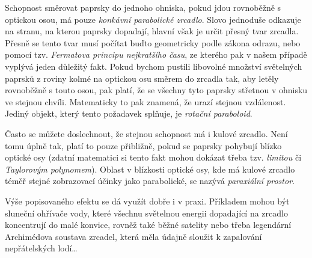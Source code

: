 \documentclass{../../../../style/mkimain}
\begin{document}
\noindent{}
\klein
Schopnost směrovat paprsky do jednoho ohniska, pokud jdou rovnoběžně s optickou osou, má pouze \emph{konkávní parabolické zrcadlo}.
Slovo  jednoduše odkazuje na stranu, na kterou paprsky dopadají, hlavní však je určit přesný tvar zrcadla.
Přesně se tento tvar musí počítat buďto geometricky podle zákona odrazu, nebo pomocí tzv. \emph{Fermatova principu nejkratšího času},
ze kterého pak v našem případě vyplývá jeden důležitý fakt.
Pokud bychom pustili libovolné množství světelných paprsků z roviny kolmé na optickou osu směrem do zrcadla tak,
aby letěly rovnoběžně s touto osou, pak platí, že se všechny tyto paprsky střetnou v ohnisku ve stejnou chvíli.
Matematicky to pak znamená, že urazí stejnou vzdálenost. Jediný objekt, který tento požadavek splňuje, je \emph{rotační paraboloid}.

Často se můžete doslechnout, že stejnou schopnost má i kulové zrcadlo. Není tomu úplně tak, platí to pouze přibližně,
pokud se paprsky pohybují blízko optické osy (zdatní matematici si tento fakt mohou dokázat třeba tzv.
\emph{limitou} či \emph{Taylorovým polynomem}).
Oblast v blízkosti optické osy, kde má kulové zrcadlo téměř stejné zobrazovací účinky jako parabolické, se nazývá \emph{paraxiální prostor}.


Výše popisovaného efektu se dá využít dobře i v praxi.
Příkladem mohou být sluneční ohřívače vody, které všechnu světelnou energii dopadající na zrcadlo koncentrují do malé konvice,
rovněž také běžné satelity nebo třeba legendární Archimédova soustava zrcadel, která měla údajně sloužit k zapalování nepřátelských lodí\dots 
\end{document}

